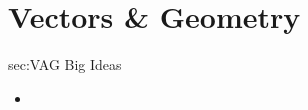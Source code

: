 \chapter{Vectors \& Geometry}
\label{chap:VAG}

\begin{bigideas}{sec:VAG Big Ideas}
\begin{itemize}
  \item 
\end{itemize}
\end{bigideas}